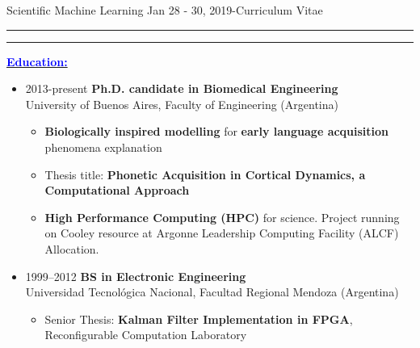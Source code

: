 \documentclass{article}
\newcommand{\soptitle}{Scientific Machine Learning Jan 28 - 30, 2019-Curriculum Vitae}
\newcommand{\yourname}{Dario Dematties}
\newcommand{\statement}[1]{\par\medskip
  \underline{\textcolor{blue}{\textbf{#1:}}}\space
}
\begin{document}
\begin{center}
\LARGE \soptitle\\


\end{center}

\hrule
\vspace{1pt}
\hrule height 1pt

\bigskip


\statement{Education}
\begin{itemize}
	\item 2013-present {\bf Ph.D. candidate in Biomedical Engineering}\\
University of Buenos Aires, Faculty of Engineering (Argentina)
\begin{itemize}
	\item \textbf{Biologically inspired modelling} for \textbf{early language acquisition} phenomena explanation
	\item Thesis title: \textbf{Phonetic Acquisition in Cortical Dynamics, a Computational Approach}
	\item \textbf{High Performance Computing (HPC)} for science. Project running on Cooley resource at Argonne Leadership Computing Facility (ALCF) Allocation.
\end{itemize}


\item 1999--2012 {\bf BS in Electronic Engineering}\\
Universidad Tecnol\'ogica Nacional, Facultad Regional Mendoza (Argentina)
\begin{itemize}
	\item Senior Thesis: \textbf{Kalman Filter Implementation in FPGA}, Reconfigurable Computation Laboratory
\end{itemize}
\end{itemize}
\end{document}
